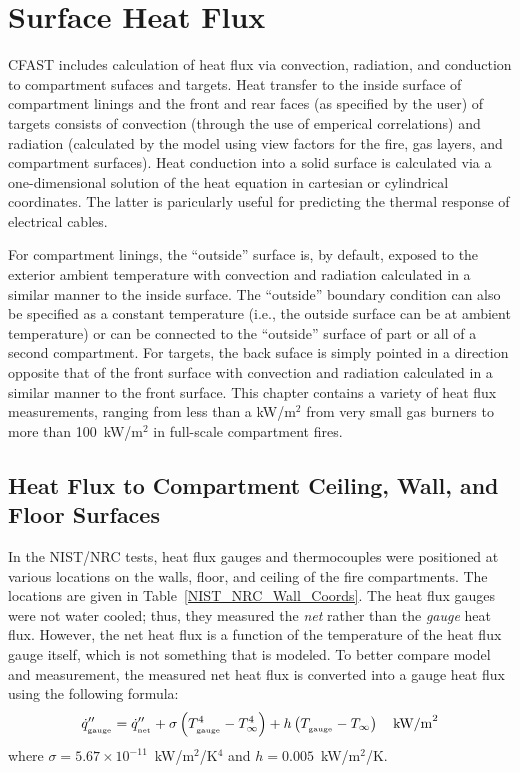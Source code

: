\chapter{Surface Heat Flux}

CFAST includes calculation of heat flux via convection, radiation, and conduction to compartment sufaces and targets. Heat transfer to the inside surface of compartment linings and the front and rear faces (as specified by the user) of targets consists of convection (through the use of emperical correlations) and radiation (calculated by the model using view factors for the fire, gas layers, and compartment surfaces). Heat conduction into a solid surface is calculated via a one-dimensional solution of the heat equation in cartesian or cylindrical coordinates.  The latter is paricularly useful for predicting the thermal response of electrical cables.

For compartment linings, the ``outside'' surface is, by default, exposed to the exterior ambient temperature with convection and radiation calculated in a similar manner to the inside surface.  The ``outside'' boundary condition can also be specified as a constant temperature (i.e., the outside surface can be at ambient temperature) or can be connected to the ``outside'' surface of part or all of a second compartment.  For targets, the back suface is simply pointed in a direction opposite that of the front surface with convection and radiation calculated in a similar manner to the front surface. This chapter contains a variety of heat flux measurements, ranging from less than a kW/m$^2$ from very small gas burners  to more than 100~kW/m$^2$ in full-scale compartment fires.

\section{Heat Flux to  Compartment Ceiling, Wall, and Floor Surfaces}

In the NIST/NRC tests, heat flux gauges and thermocouples were positioned at various locations on the walls, floor, and ceiling of the fire compartments. The locations are given in Table~\ref{NIST_NRC_Wall_Coords}. The heat flux gauges were not water cooled; thus, they measured the {\em net} rather than the {\em gauge} heat flux. However, the net heat flux is a function of the temperature of the heat flux gauge itself, which is not something that is modeled. To better compare model and measurement, the measured net heat flux is converted into a gauge heat flux using the following formula:
\begin{equation}
\dot{q}''_{_{\textnormal{gauge}}} = \dot{q}''_{_{\textnormal{net}}} + \sigma \left( T^4_{_{\textnormal{gauge}}} - T^4_\infty \right) + h  \left( T_{_{\textnormal{gauge}}}-T_\infty \right) \quad \hbox{kW/m}^2
\end{equation}
where $\sigma=5.67 \times 10^{-11}$~kW/m$^2$/K$^4$ and $h=0.005$~kW/m$^2$/K.

